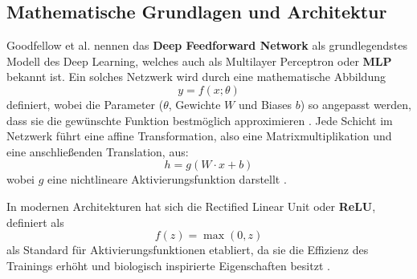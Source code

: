 \subsection{Mathematische Grundlagen und Architektur}
Goodfellow et al. \cite{Goodfellow-et-al-2016} nennen das \textbf{Deep Feedforward Network} als grundlegendstes Modell des Deep Learning, welches auch als Multilayer Perceptron oder \textbf{MLP} bekannt ist. Ein solches Netzwerk wird durch eine mathematische Abbildung 
\begin{equation}
	y = f(x; \theta)
\end{equation}
definiert, wobei die Parameter ($\theta$, Gewichte $W$ und Biases $b$) so angepasst werden, dass sie die gewünschte Funktion bestmöglich approximieren \cite{Goodfellow-et-al-2016, francois-lavetIntroductionDeepReinforcement2018}. Jede Schicht im Netzwerk führt eine affine Transformation, also eine Matrixmultiplikation und eine anschließenden Translation, aus:
\begin{equation}
	h = g(W\cdot x + b)
\end{equation}
wobei $g$ eine nichtlineare Aktivierungsfunktion darstellt \cite{Goodfellow-et-al-2016}.

In modernen Architekturen hat sich die Rectified Linear Unit oder \textbf{ReLU}, definiert als 
\begin{equation}
	f(z) = \max(0, z)
\end{equation}
als Standard für Aktivierungsfunktionen etabliert, da sie die Effizienz des Trainings erhöht und biologisch inspirierte Eigenschaften besitzt \cite{Goodfellow-et-al-2016}. 

